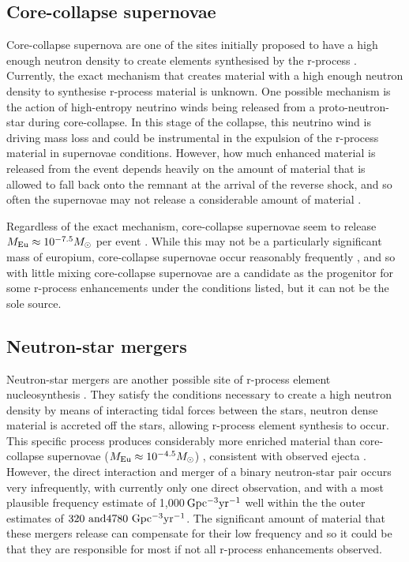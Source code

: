 \documentclass[a4paper,fleqn,usenatbib]{mnras}
\begin{document}
	\subsection{Core-collapse supernovae}
	Core-collapse supernova are one of the sites initially proposed to have a high enough neutron density to create elements synthesised by the r-process \citep{Burbidge1957}. Currently, the exact  mechanism that creates material with a high enough neutron density to synthesise r-process material is unknown.
	One possible mechanism is the action of high-entropy neutrino winds being released from a proto-neutron-star during core-collapse. In this stage of the collapse, this neutrino wind is driving mass loss and could be instrumental in the expulsion of the r-process material in supernovae conditions. However, how much enhanced material is released from the event depends heavily on the amount of material that is allowed to fall back onto the remnant at the arrival of the reverse shock, and so often the supernovae may not release a considerable amount of material \citep{Woosley1992, Burrows1995}. 
	
	Regardless of the exact mechanism, core-collapse supernovae seem to release $M_{\rm{Eu}}\approx10^{-7.5} M_{\odot}$ per event \citep{Argast2004}. While this may not be a particularly significant mass of europium, core-collapse supernovae occur reasonably frequently \citep[44,700$\,\ \rm{Gpc}^{-3} \rm{yr^{-1}}$;][]{Li2011}, and so with little mixing core-collapse supernovae are a candidate as the progenitor for some r-process enhancements under the conditions listed, but it can not be the sole source.
	
	\subsection{Neutron-star mergers}
	\label{NSmerg}
	Neutron-star mergers are another possible site of r-process element nucleosynthesis \citep{Kasen2017,Hotok2013,Drout2017}. They satisfy the conditions necessary to create a high neutron density by means of interacting tidal forces between the stars, neutron dense material is accreted off the stars, allowing r-process element synthesis to occur. This specific process produces considerably more enriched material than core-collapse supernovae ($M_{\rm{Eu}}\approx10^{-4.5} M_{\odot}$) \citep{Goriely2011}, consistent with observed ejecta \citep{Kasliwal2017}. However, the direct interaction and merger of a binary neutron-star pair occurs very infrequently, with currently only one direct observation, and with a most plausible frequency estimate of 1,000$\,\rm{Gpc^{-3}yr^{-1}}$ \citep{LIGO2016,Abadie2010} well within the the outer estimates of $320\ \rm and 4780\ \rm{Gpc^{-3}yr^{-1}}$. The significant amount of material that these mergers release can compensate for their low frequency and so it could be that they are responsible for most if not all r-process enhancements observed.
\end{document}
